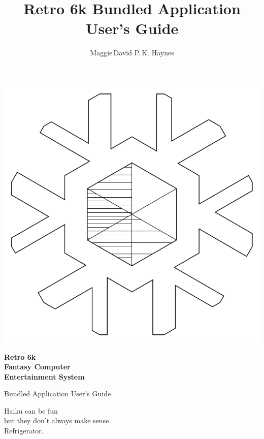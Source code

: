 \documentclass[12pt]{{memoir}}
\begin{document}
\title{Retro 6k Bundled Application User's Guide}
\author{Maggie\,David P.\,K. Haynes}
\pagestyle{empty}
\begin{center}
\includegraphics{../common-src/logolineart}

{\sffamily\bfseries\Huge{}Retro 6k\\Fantasy Computer\\Entertainment System

Bundled Application User's Guide\par}
{\sffamily\bfseries\large\theauthor\par}
\end{center}
\cleartoverso
{}
\begin{center}
\noindent{}Haiku can be fun\\
but they don't always make sense.\\
Refrigerator.\par
\end{center}

\cleartorecto
\tableofcontents*
\clearpage
\pagestyle{headings}
\end{document}
